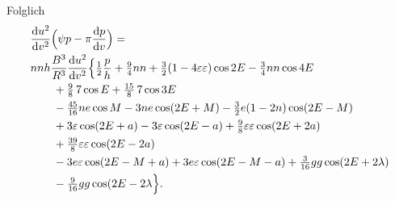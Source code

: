 \noindent Folglich
\[
\begin{aligned}
&\frac{\mathrm du^2}{\mathrm dv^2}
 \Bigl(\psi p-\pi\frac{\mathrm dp}{\mathrm dv}\Bigr)=\\
&nnh\frac{B^3}{R^3}\frac{\mathrm du^2}{\mathrm dv^2}
 \Bigl\{\tfrac12\frac{p}{h}+\tfrac94nn
 +\tfrac32(1-4\varepsilon\varepsilon)\cos2E-\tfrac34nn\cos4E\\
&\qquad+\tfrac98\,7\cos E+\tfrac{15}{8}\,7\cos3E\\
&\qquad-\tfrac{45}{16}ne\cos M-3ne\cos(2E+M)
 -\tfrac32e(1-2n)\cos(2E-M)\\
&\qquad+3\varepsilon\cos(2E+a)-3\varepsilon\cos(2E-a)
 +\tfrac98\varepsilon\varepsilon\cos(2E+2a)\\
&\qquad+\tfrac{39}{8}\varepsilon\varepsilon\cos(2E-2a)\\
&\qquad-3e\varepsilon\cos(2E-M+a)+3e\varepsilon\cos(2E-M-a)
 +\tfrac{3}{16}gg\cos(2E+2\lambda)\\
&\qquad-\tfrac{9}{16}gg\cos(2E-2\lambda\Bigr\}.
\end{aligned}
\]
\endgroup
